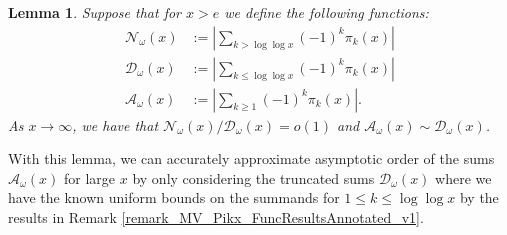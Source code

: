 \documentclass[11pt,reqno,a4letter]{article}
\numberwithin{figure}{section}
\numberwithin{table}{section}
\theoremstyle{plain}
\newtheorem{lemma}[theorem]{Lemma}
\numberwithin{theorem}{section}
\theoremstyle{definition}
\begin{document}
\begin{lemma} 
\label{cor_AsymptoticsForSignedSumsOfomegan_v1} 
Suppose that for $x > e$ we define the following functions: 
\begin{align*} 
\mathcal{N}_{\omega}(x) & := \left\lvert \sum_{k > \log\log x} (-1)^{k} \pi_k(x) \right\rvert \\ 
\mathcal{D}_{\omega}(x) & := \left\lvert \sum_{k \leq \log\log x} (-1)^{k} \pi_k(x) \right\rvert \\ 
\mathcal{A}_{\omega}(x) & := \left\lvert \sum_{k \geq 1} (-1)^{k} \pi_k(x) \right\rvert. 
\end{align*} 
As $x \rightarrow \infty$, we have that $\mathcal{N}_{\omega}(x) / \mathcal{D}_{\omega}(x) = o(1)$ 
and $\mathcal{A}_{\omega}(x) \sim \mathcal{D}_{\omega}(x)$. 
\end{lemma} 
With this lemma, we can accurately approximate asymptotic order of 
the sums $\mathcal{A}_{\omega}(x)$
for large $x$ by only considering the truncated sums 
$\mathcal{D}_{\omega}(x)$  
where we have the known uniform bounds on the summands for 
$1 \leq k \leq \log\log x$ by the results in 
Remark \ref{remark_MV_Pikx_FuncResultsAnnotated_v1}. 
\end{document}
